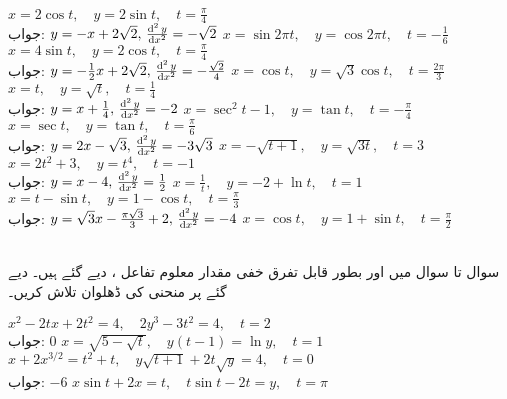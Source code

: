 $x=2\cos t,\quad y=2\sin t,\quad t=\tfrac{\pi}{4}$\\
جواب:\quad
$y=-x+2\sqrt{2},\, \frac{\dif^{\,2}y}{\dif x^2}=-\sqrt{2}$
$x=\sin 2\pi t,\quad y=\cos 2\pi t,\quad t=-\frac{1}{6}$
$x=4\sin t,\quad y=2\cos t,\quad t=\frac{\pi}{4}$\\
جواب:\quad
$y=-\tfrac{1}{2}x+2\sqrt{2},\, \frac{\dif^{\,2}y}{\dif x^2}=-\frac{\sqrt{2}}{4}$
$x=\cos t,\quad y=\sqrt{3}\cos t,\quad t=\frac{2\pi}{3}$
$x=t,\quad y=\sqrt{t},\quad t=\frac{1}{4}$\\
جواب:\quad
$y=x+\frac{1}{4},\, \frac{\dif^{\,2}y}{\dif x^2}=-2$
$x=\sec^2t-1,\quad y=\tan t,\quad t=-\frac{\pi}{4}$
$x=\sec t,\quad y=\tan t,\quad t=\frac{\pi}{6}$\\
جواب:\quad
$y=2x-\sqrt{3},\, \frac{\dif^{\,2}y}{\dif x^2}=-3\sqrt{3}$
$x=-\sqrt{t+1},\quad y=\sqrt{3t},\quad t=3$
$x=2t^2+3,\quad y=t^4,\quad t=-1$\\
جواب:\quad
$y=x-4,\, \frac{\dif^{\,2}y}{\dif x^2}=\tfrac{1}{2}$
$x=\frac{1}{t},\quad y=-2+\ln t,\quad t=1$
$x=t-\sin t,\quad y=1-\cos t,\quad t=\frac{\pi}{3}$\\
جواب:\quad
$y=\sqrt{3}x-\tfrac{\pi\sqrt{3}}{3}+2,\, \frac{\dif^{\,2}y}{\dif x^2}=-4$
$x=\cos t,\quad y=1+\sin t,\quad t=\frac{\pi}{2}$

\\
سوال  تا سوال  میں  اور  بطور قابل تفرق خفی مقدار معلوم  تفاعل ،  دیے گئے ہیں۔  دیے گئے  پر منحنی  کی ڈھلوان تلاش کریں۔

$x^2-2tx+2t^2=4,\quad 2y^3-3t^2=4,\quad t=2$\\
جواب:\quad
$0$
$x=\sqrt{5-\sqrt{t}},\quad y(t-1)=\ln y,\quad t=1$
$x+2x^{3/2}=t^2+t,\quad y\sqrt{t+1}+2t\sqrt{y}=4,\quad t=0$\\
جواب:\quad
$-6$
$x\sin t+2x=t,\quad t\sin t-2t=y,\quad t=\pi$

